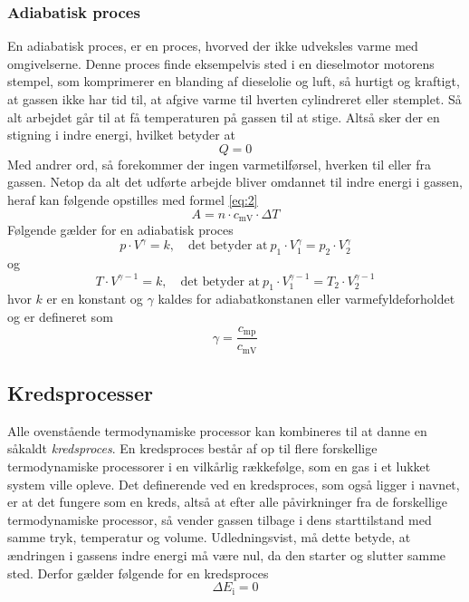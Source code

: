 \documentclass[SRC.tex]{subfiles}
\begin{document}
	\subsubsection{Adiabatisk proces}
	En adiabatisk proces, er en proces, hvorved der ikke udveksles varme med 
	omgivelserne. Denne proces finde eksempelvis sted i en dieselmotor motorens 
	stempel, som komprimerer en blanding af dieselolie og luft, så hurtigt og kraftigt,
	at gassen ikke har tid til, at afgive varme til hverten cylindreret eller stemplet. Så alt arbejdet går til at få temperaturen på gassen til at stige. Altså sker der en stigning i indre energi, hvilket betyder at 
	\begin{equation}
	Q = 0
	\end{equation}
	Med andrer ord, så forekommer der ingen varmetilførsel, hverken til eller fra gassen. Netop da 
	alt det udførte arbejde bliver omdannet til indre energi i gassen, heraf kan
	følgende opstilles med formel \eqref{eq:2}
	\begin{equation}
	A = n \cdot c_{\text{mV}} \cdot \Delta T 
	\end{equation}
	Følgende gælder for en adiabatisk proces
	\begin{equation}
	p \cdot V^\gamma = k,\quad \text{det betyder at}\ p_1 \cdot V_1^\gamma= p_2 \cdot V_2^\gamma
	\end{equation}
	og 
	\begin{equation}
	T \cdot V^{\gamma-1} = k,\quad \text{det betyder at}\ p_1 \cdot V_1^{\gamma-1}= T_2 \cdot V_2^{\gamma-1}
	\end{equation}
	hvor \(k\) er en konstant og \(\gamma\) kaldes
	for adiabatkonstanen eller varmefyldeforholdet og er defineret som
	\begin{equation}
	\gamma = \frac{c_{\textrm{mp}}}{c_{\textrm{mV}}}
	\end{equation}
	\subsection{Kredsprocesser}
	Alle ovenstående termodynamiske processor kan kombineres til at danne
	en såkaldt \textit{kredsproces}. En kredsproces består af op til flere 
	forskellige termodynamiske processorer i en vilkårlig rækkefølge, som en gas i 
	et lukket system ville opleve. Det definerende ved en kredsproces, som også 
	ligger i navnet, er at det fungere som en kreds, altså at efter alle påvirkninger
	fra de forskellige termodynamiske processor, så vender gassen tilbage i dens starttilstand med
	samme tryk, temperatur og volume. Udledningsvist, må dette betyde, at ændringen 
	i gassens indre energi må være nul, da den starter og slutter samme sted. Derfor gælder følgende for en kredsproces
	\begin{equation}
	\Delta E_\text{i} = 0
	\end{equation} 
\end{document}
